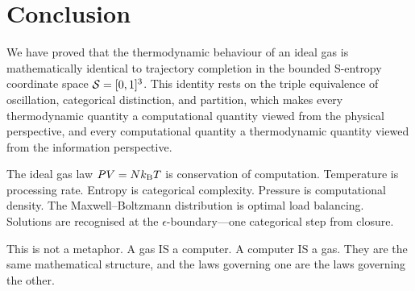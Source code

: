 \section{Conclusion}
\label{sec:conclusion}

We have proved that the thermodynamic behaviour of an ideal gas is mathematically identical to trajectory completion in the bounded S-entropy coordinate space $\mathcal{S} = [0,1]^3$. This identity rests on the triple equivalence of oscillation, categorical distinction, and partition, which makes every thermodynamic quantity a computational quantity viewed from the physical perspective, and every computational quantity a thermodynamic quantity viewed from the information perspective.

The ideal gas law $PV = Nk_{\mathrm{B}} T$ is conservation of computation. Temperature is processing rate. Entropy is categorical complexity. Pressure is computational density. The Maxwell--Boltzmann distribution is optimal load balancing. Solutions are recognised at the $\epsilon$-boundary---one categorical step from closure.

This is not a metaphor. A gas IS a computer. A computer IS a gas. They are the same mathematical structure, and the laws governing one are the laws governing the other.

